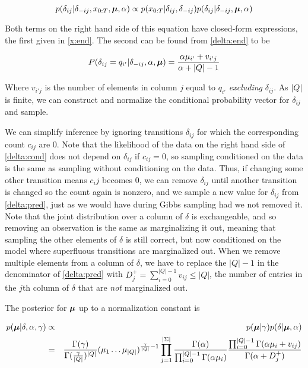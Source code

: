 \begin{equation}
p(\delta_{ij}|\delta_{-ij},x_{0:T},\bmu,\alpha) \propto p(x_{0:T}|\delta_{ij},\delta_{-ij})p(\delta_{ij}|\delta_{-ij},\bmu,\alpha) \label{delta:cond}
\end{equation}

Both terms on the right hand side of this equation have closed-form expressions, the first given in \eqref{x:end}.  The second can be found from \eqref{delta:end} to be

\begin{equation}
P(\delta_{ij} = q_{i'}|\delta_{-ij},\alpha,\bmu) = \frac{\alpha\mu_{i'} + v_{i'j}}{\alpha + |Q| - 1} \label{delta:pred}
\end{equation}

Where $v_{i'j}$ is the number of elements in column $j$ equal to $q_{i'}$ {\em excluding} $\delta_{ij}$.  As $|Q|$ is finite, we can construct and normalize the conditional probability vector for $\delta_{ij}$ and sample.

We can simplify inference by ignoring transitions $\delta_{ij}$ for which the corresponding count $c_{ij}$ are 0.  Note that the likelihood of the data on the right hand side of \eqref{delta:cond} does not depend on $\delta_{ij}$ if $c_{ij} = 0$, so sampling conditioned on the data is the same as sampling without conditioning on the data.  Thus, if changing some other transition means $c_ij$ becomes 0, we can remove $\delta_{ij}$ until another transition is changed so the count again is nonzero, and we sample a new value for $\delta_{ij}$ from \eqref{delta:pred}, just as we would have during Gibbs sampling had we not removed it.  Note that the joint distribution over a column of $\delta$ is exchangeable, and so removing an observation is the same as marginalizing it out, meaning that sampling the other elements of $\delta$ is still correct, but now conditioned on the model where superfluous transitions are marginalized out.  When we remove multiple elements from a column of $\delta$, we have to replace the $|Q| - 1$ in the denominator of \eqref{delta:pred} with $D^+_j = \sum_{i=0}^{|Q|-1}v_{ij} \leq |Q|$, the number of entries in the $j$th column of $\delta$ that are {\em not} marginalized out.

The posterior for $\bmu$ up to a normalization constant is

\begin{eqnarray}
p(\bmu|\delta,\alpha,\gamma) & \propto & p(\bmu|\gamma) p(\delta|\bmu,\alpha)\nonumber \\
& = & \frac{\Gamma(\gamma)}{\Gamma(\frac{\gamma}{|Q|})^{|Q|}}(\mu_1\ldots\mu_{|Q|})^{\frac{\gamma}{|Q|}-1}\prod_{j=1}^{|\Sigma|} \frac{\Gamma(\alpha)}{\prod_{i=0}^{|Q|-1}\Gamma(\alpha\mu_i)} \frac{\prod_{i=0}^{|Q|-1} \Gamma(\alpha\mu_i + v_{ij})}{\Gamma(\alpha + D^+_j)}
\end{eqnarray}

